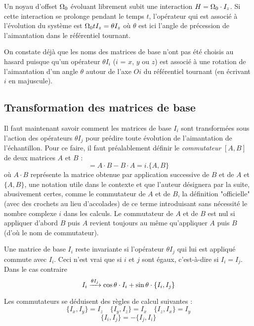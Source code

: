 Un noyau d'offset $\Omega_0$ évoluant librement subit une interaction
$H = \Omega_0 \cdot I_z$. 
Si cette interaction se prolonge pendant le temps $t$, l'opérateur qui
est associé à l'évolution du système est $\Omega_0 t I_z = \theta I_z$
où $\theta$ est ici l'angle de précession de l'aimantation dans le
référentiel tournant.

On constate déjà que les noms des matrices de base n'ont pas été choisis
au hasard puisque qu'un opérateur $\theta I_i$ ($i$ = $x$, $y$ ou $z$) 
est associé à une rotation de l'aimantation d'un angle $\theta$ autour de l'axe $Oi$
du référentiel tournant (en écrivant $i$ en majuscule).

\subsection{Transformation des matrices de base}
\label{subsec:transf}
Il faut maintenant savoir comment les matrices de base $I_i$ sont transformées
sous l'action des opérateurs $\theta I_j$ pour prédire toute évolution
de l'aimantation de l'échantillon.
Pour ce faire, il faut préalablement définir le \emph{commutateur} 
$[A,B]$ de deux matrices $A$ et $B$ :
\begin{equation}
[A,B] = A \cdot B - B \cdot A = i.\{A,B\}
\end{equation}
où $A \cdot B$ représente la matrice obtenue par application successive de $B$ et de $A$
et $\{A,B\}$, une notation utile dans le contexte et que
l'auteur désignera par la suite, abusivement certes, comme le
commutateur de $A$ et de $B$, la définition "officielle" (avec des crochets au lieu
d'accolades) de ce terme
introduisant sans nécessité le nombre complexe $i$ dans les calculs.
Le commutateur de $A$ et de $B$ est nul si appliquer d'abord $B$ puis $A$
revient toujours au même qu'appliquer $A$ puis $B$ (d'où le nom de commutateur).

Une matrice de base $I_i$ reste invariante si l'opérateur 
$\theta I_j$ qui lui est appliqué commute avec $I_i$.
Ceci n'est vrai que si $i$ et $j$ sont égaux, c'est-à-dire si $I_i = I_j$.
Dans le cas contraire
\begin{equation}
I_i \xrightarrow{\theta I_j} 
\cos\theta \cdot I_i + \sin\theta \cdot \{I_i,I_j\}
\end{equation}

Les commutateurs se déduisent des règles de calcul suivantes :
\begin{equation}
\label{eqn:commutsimple}
\{I_x,I_y\} = I_z \quad \{I_y,I_z\} = I_x \quad \{I_z,I_x\} = I_y
\end{equation}
\begin{equation}
\{I_i,I_j\} = - \{I_j,I_i\}
\end{equation}

